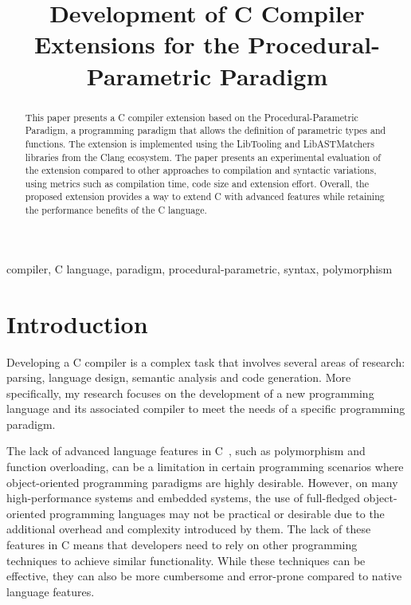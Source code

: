 \documentclass[conference]{IEEEtran}
\title{Development of C Compiler Extensions for the Procedural-Parametric Paradigm}
\author{
  \IEEEauthorblockN{\myname}
  \IEEEauthorblockA{\textit{Faculty of Computer Science, Department of Software Engineering} \\
  \textit{National Research University Higher School of Economics}\\
  Moscow, Russia \\
  \AA{knborisov@edu.hse.ru}{8}}
}
\def\mykeywords{compiler, C language, paradigm, procedural-parametric, syntax, polymorphism}
\begin{document}
\maketitle

\begin{abstract}
  This paper presents a C compiler extension based on the Procedural-Parametric Paradigm, a programming paradigm that allows the definition of parametric types and functions.
  The extension is implemented using the LibTooling and LibASTMatchers libraries from the Clang ecosystem.
  The paper presents an experimental evaluation of the extension compared to other approaches to compilation and syntactic variations, using metrics such as compilation time, code size and extension effort.
  Overall, the proposed extension provides a way to extend C with advanced features while retaining the performance benefits of the C language.
\end{abstract}

\begin{IEEEkeywords}\mykeywords\end{IEEEkeywords}

\section{Introduction}

Developing a C compiler is a complex task that involves several areas of research:
parsing, language design, semantic analysis and code generation.
More specifically, my research focuses on the
development of a new programming language and its associated compiler to meet the needs of a specific programming paradigm.

The lack of advanced language features in C~\cite{kernighan1988c}, such as polymorphism and function overloading,
can be a limitation in certain programming scenarios where object-oriented programming paradigms are highly desirable.
However, on many high-performance systems and embedded systems, the use of full-fledged object-oriented programming languages
may not be practical or desirable due to the additional overhead and complexity introduced by them.
The lack of these features in C means that developers need to rely on other programming techniques to achieve similar functionality.
While these techniques can be effective, they can also be more cumbersome and error-prone compared to native language features.
\end{document}
